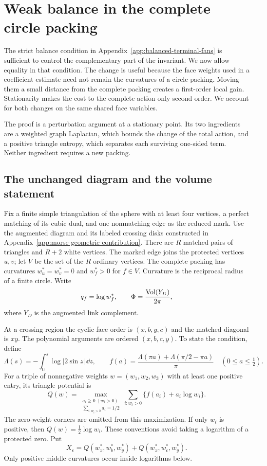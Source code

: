 \chapter{Weak balance in the complete circle packing}
\label{app:weak-balance}

The strict balance condition in Appendix~\ref{app:balanced-terminal-fans}
is sufficient to control the complementary part of the invariant. We now
allow equality in that condition. The change is useful because the face
weights used in a coefficient estimate need not remain the curvatures
of a circle packing. Moving them a small distance from the complete
packing creates a first-order local gain. Stationarity makes the cost
to the complete action only second order. We account for both changes
on the same shared face variables.

The proof is a perturbation argument at a stationary point. Its two
ingredients are a weighted graph Laplacian, which bounds the change of
the total action, and a positive triangle entropy, which separates each
surviving one-sided term. Neither ingredient requires a new packing.

\section{The unchanged diagram and the volume statement}

Fix a finite simple triangulation of the sphere with at least four
vertices, a perfect matching of its cubic dual, and one nonmatching
edge as the reduced mark. Use the augmented diagram and its labeled
crossing disks constructed in Appendix~\ref{app:morse-geometric-contribution}.
There are $R$ matched pairs of triangles and $R+2$ white vertices.
The marked edge joins the protected vertices $u,v$; let $V$ be the
set of the $R$ ordinary vertices. The complete packing has curvatures
$w_u^*=w_v^*=0$ and $w_f^*>0$ for $f\in V$. Curvature is the
reciprocal radius of a finite circle. Write
\[
 q_f=\log w_f^*,\qquad
 \Phi=\frac{\operatorname{Vol}(Y_D)}{2\pi},
\]
where $Y_D$ is the augmented link complement.

At a crossing region the cyclic face order is $(x,b,y,c)$ and the
matched diagonal is $xy$. The polynomial arguments are ordered
$(x,b,c,y)$. To state the condition, define
\[
 \Lambda(s)=-\int_0^s\log|2\sin z|\,\dd z,
 \qquad f(a)=\frac{\Lambda(\pi a)+\Lambda(\pi/2-\pi a)}{\pi}
       \quad(0\le a\le\tfrac12).
\]
For a triple of nonnegative weights $w=(w_1,w_2,w_3)$ with at least
one positive entry, its triangle potential is
\[
 Q(w)=\max_{\substack{a_i\ge0\ (w_i>0)\\
                     \sum_{i:w_i>0}a_i=1/2}}
           \sum_{i:w_i>0}\{f(a_i)+a_i\log w_i\}.
\]
The zero-weight corners are omitted from this maximization. If only
$w_i$ is positive, then $Q(w)=\tfrac12\log w_i$. These conventions
avoid taking a logarithm of a protected zero. Put
\[
 X_e=Q(w_x^*,w_b^*,w_y^*)+Q(w_x^*,w_c^*,w_y^*).
\]
Only positive middle curvatures occur inside logarithms below.

